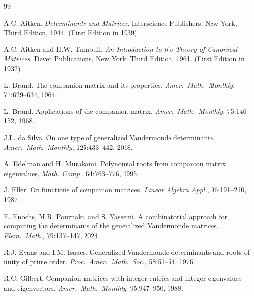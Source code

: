 \documentclass{article}
\theoremstyle{definition}
\begin{document}
\begin{thebibliography}{99}

A.C. Aitken.
\newblock \emph{Determinants and Matrices}.
\newblock Interscience Publishers,
New York, Third Edition, 1944.  (First Edition in 1939)

A.C. Aitken and H.W. Turnbull. 
\newblock \emph{An Introduction to the Theory of Canonical Matrices}.
\newblock Dover Publications, New York, Third Edition, 1961.  (First Edition in 1932)

L. Brand.
\newblock The companion matrix and its properties.
\newblock \emph{Amer.\ Math.\ Monthly}, 71:629--634, 1964. 

L. Brand. 
\newblock Applications of the companion matrix. 
\newblock \emph{Amer.\ Math.\ Monthly}, 75:146--152, 1968. 

J.L. da Silva.
\newblock On one type of generalized Vandermonde determinants.
\newblock \emph{Amer.\ Math.\ Monthly}, 125:433--442, 2018. 

A. Edelman and H. Murakami.
\newblock Polynomial roots from companion matrix eigenvalues, 
\newblock \emph{Math. Comp.}, 64:763--776, 1995. 

J. Eller.
\newblock On functions of companion matrices.
\newblock \emph{Linear Algebra Appl.}, 96:191--210, 1987. 

E. Enochs, M.R. Pournaki, and S. Yassemi.
\newblock A combinatorial approach for computing the determinants of the generalized Vandermonde matrices.
\newblock \emph{Elem.\ Math.}, 79:137--147,  2024. 

R.J. Evans and I.M. Isaacs.
\newblock Generalized Vandermonde determinants and roots of unity of prime order.
\newblock \emph{Proc.\ Amer.\ Math.\ Soc.}, 58:51--54, 1976. 

 R.C. Gilbert.
\newblock Companion matrices with integer entries and integer eigenvalues and eigenvectors.
\newblock \emph{Amer.\ Math.\ Monthly}, 95:947--950, 1988. 


\end{thebibliography}
\end{document}
